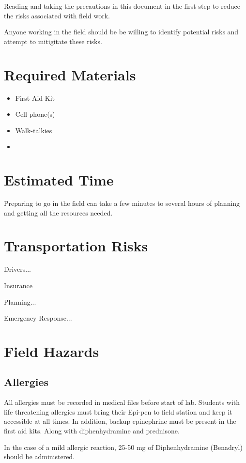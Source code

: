 \documentclass[12pt]{../SOP2}
\begin{document}
\NP Reading and taking the precautions in this document in the first step to reduce the risks associated with field work. 

\NP Anyone working in the field should be be willing to identify potential risks and attempt to mitigitate these risks. 

\section{Required Materials}

\begin{itemize}
  \item First Aid Kit
  \item Cell phone(s)
  \item Walk-talkies
  \item 
\end{itemize}

\section{Estimated Time}

\NP Preparing to go in the field can take a few minutes to several hours of planning and getting all the resources needed.

\section{Transportation Risks}

\NP Drivers...

\NP Insurance

\NP Planning...

\NP Emergency Response...


\section{Field Hazards}

\subsection{Allergies}

\NP All allergies must be recorded in medical files before start of lab. Students with life threatening allergies must bring their Epi-pen to field station and keep it accessible at all times. In addition, backup epinephrine must be present in the first aid kits. Along with diphenhydramine and prednisone. 

\NP In the case of a mild allergic reaction, 25-50 mg of Diphenhydramine (Benadryl) should be administered. 
\end{document}
